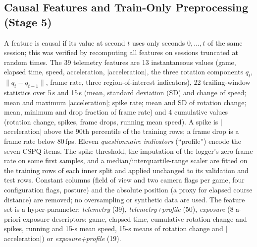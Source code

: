 \subsection{Causal Features and Train-Only Preprocessing (Stage 5)}
\label{sec:features}
A feature is causal if its value at second $t$ uses only seconds $0,\dots,t$ of the same session; this was verified by recomputing all features on sessions truncated at random times. The 39 telemetry features are 13 instantaneous values (game, elapsed time, speed, acceleration, $|$acceleration$|$, the three rotation components $q_t$, $\lVert q_t-q_{t-1}\rVert$, frame rate, three region-of-interest indicators), 22 trailing-window statistics over 5\,s and 15\,s (mean, standard deviation (SD) and change of speed; mean and maximum $|$acceleration$|$; spike rate; mean and SD of rotation change; mean, minimum and drop fraction of frame rate) and 4 cumulative values (rotation change, spikes, frame drops, running mean speed). A spike is $|$acceleration$|$ above the 90th percentile of the training rows; a frame drop is a frame rate below 80\,fps. Eleven \emph{questionnaire indicators} (``profile'') encode the seven CSPQ items. The spike threshold, the imputation of the logger's zero frame rate on some first samples, and a median/interquartile-range scaler are fitted on the training rows of each inner split and applied unchanged to its validation and test rows. Constant columns (field of view and two camera flags per game, four configuration flags, posture) and the absolute position (a proxy for elapsed course distance) are removed; no oversampling or synthetic data are used. The feature set is a hyper-parameter: \emph{telemetry} (39), \emph{telemetry+profile} (50), \emph{exposure} (8 a-priori exposure descriptors: game, elapsed time, cumulative rotation change and spikes, running and 15-s mean speed, 15-s means of rotation change and $|$acceleration$|$) or \emph{exposure+profile} (19).

